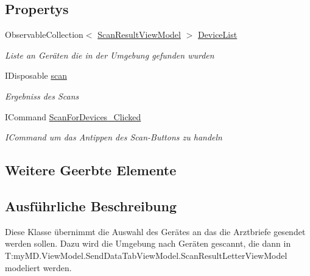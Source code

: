 \subsection*{Propertys}
\begin{DoxyCompactItemize}
\item 
Observable\+Collection$<$ \mbox{\hyperlink{classmy_m_d_1_1_view_model_1_1_send_data_tab_view_model_1_1_scan_result_view_model}{Scan\+Result\+View\+Model}} $>$ \mbox{\hyperlink{classmy_m_d_1_1_view_model_1_1_send_data_tab_view_model_1_1_select_device_view_model_a2c0271b0ca7d8b38d3297d023fcbb74d}{Device\+List}}
\begin{DoxyCompactList}\small\item\em Liste an Geräten die in der Umgebung gefunden wurden \end{DoxyCompactList}\item 
I\+Disposable \mbox{\hyperlink{classmy_m_d_1_1_view_model_1_1_send_data_tab_view_model_1_1_select_device_view_model_a863852899d8408a5decf7f9e724163f9}{scan}}
\begin{DoxyCompactList}\small\item\em Ergebniss des Scans \end{DoxyCompactList}\item 
I\+Command \mbox{\hyperlink{classmy_m_d_1_1_view_model_1_1_send_data_tab_view_model_1_1_select_device_view_model_a4cc73a2d15f2489105da96da595750b0}{Scan\+For\+Devices\+\_\+\+Clicked}}
\begin{DoxyCompactList}\small\item\em I\+Command um das Antippen des Scan-\/\+Buttons zu handeln \end{DoxyCompactList}\end{DoxyCompactItemize}
\subsection*{Weitere Geerbte Elemente}


\subsection{Ausführliche Beschreibung}
Diese Klasse übernimmt die Auswahl des Gerätes an das die Arztbriefe gesendet werden sollen. Dazu wird die Umgebung nach Geräten gescannt, die dann in T\+:my\+M\+D.\+View\+Model.\+Send\+Data\+Tab\+View\+Model.\+Scan\+Result\+Letter\+View\+Model modeliert werden. 



